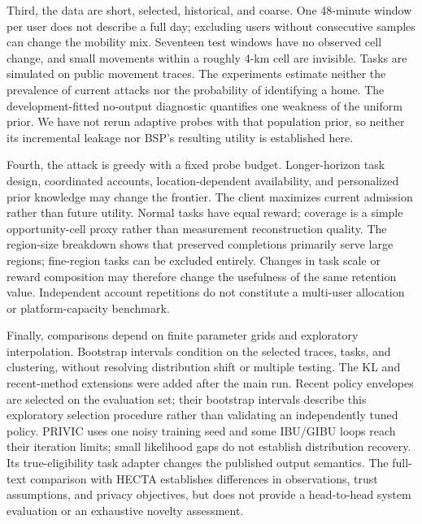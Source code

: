 \documentclass[3p,times]{elsarticle}
\begin{document}
Third, the data are short, selected, historical, and coarse. One 48-minute window per user does not describe a full day; excluding users without consecutive samples can change the mobility mix. Seventeen test windows have no observed cell change, and small movements within a roughly 4-km cell are invisible. Tasks are simulated on public movement traces. The experiments estimate neither the prevalence of current attacks nor the probability of identifying a home. The development-fitted no-output diagnostic quantifies one weakness of the uniform prior. We have not rerun adaptive probes with that population prior, so neither its incremental leakage nor BSP's resulting utility is established here.

Fourth, the attack is greedy with a fixed probe budget. Longer-horizon task design, coordinated accounts, location-dependent availability, and personalized prior knowledge may change the frontier. The client maximizes current admission rather than future utility. Normal tasks have equal reward; coverage is a simple opportunity-cell proxy rather than measurement reconstruction quality. The region-size breakdown shows that preserved completions primarily serve large regions; fine-region tasks can be excluded entirely. Changes in task scale or reward composition may therefore change the usefulness of the same retention value. Independent account repetitions do not constitute a multi-user allocation or platform-capacity benchmark.

Finally, comparisons depend on finite parameter grids and exploratory interpolation. Bootstrap intervals condition on the selected traces, tasks, and clustering, without resolving distribution shift or multiple testing. The KL and recent-method extensions were added after the main run. Recent policy envelopes are selected on the evaluation set; their bootstrap intervals describe this exploratory selection procedure rather than validating an independently tuned policy. PRIVIC uses one noisy training seed and some IBU/GIBU loops reach their iteration limits; small likelihood gaps do not establish distribution recovery. Its true-eligibility task adapter changes the published output semantics. The full-text comparison with HECTA establishes differences in observations, trust assumptions, and privacy objectives, but does not provide a head-to-head system evaluation or an exhaustive novelty assessment.
\end{document}
